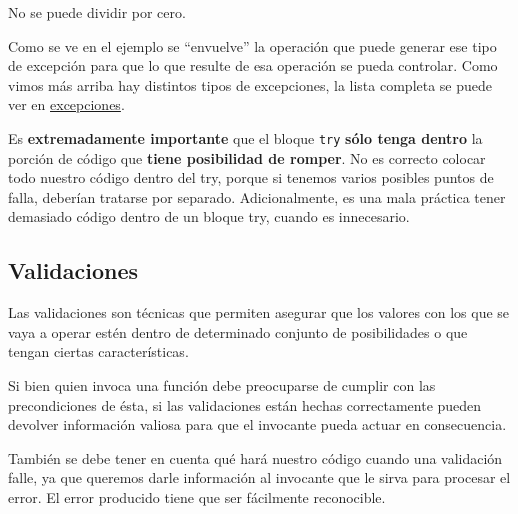 \documentclass[
  letterpaper,
  DIV=11,
  numbers=noendperiod]{scrreprt}
\newenvironment{Shaded}{\begin{snugshade}}{\end{snugshade}}
\newcommand{\ExtensionTok}[1]{\textcolor[rgb]{0.00,0.23,0.31}{#1}}
\newcommand{\NormalTok}[1]{\textcolor[rgb]{0.00,0.23,0.31}{#1}}
\begin{document}
\begin{Shaded}
\begin{Highlighting}[]
\ExtensionTok{No}\NormalTok{ se puede dividir por cero.}
\end{Highlighting}
\end{Shaded}

Como se ve en el ejemplo se ``envuelve'' la operación que puede generar
ese tipo de excepción para que lo que resulte de esa operación se pueda
controlar. Como vimos más arriba hay distintos tipos de excepciones, la
lista completa se puede ver en
\href{https://docs.python.org/es/3/library/exceptions.html\#base-classes}{excepciones}.

\begin{tcolorbox}[enhanced jigsaw, opacitybacktitle=0.6, toptitle=1mm, toprule=.15mm, arc=.35mm, breakable, bottomrule=.15mm, opacityback=0, leftrule=.75mm, rightrule=.15mm, title=\textcolor{quarto-callout-tip-color}{\faLightbulb}\hspace{0.5em}{Tip}, left=2mm, bottomtitle=1mm, colframe=quarto-callout-tip-color-frame, colback=white, titlerule=0mm, coltitle=black, colbacktitle=quarto-callout-tip-color!10!white]

Es \textbf{extremadamente importante} que el bloque \texttt{try}
\textbf{sólo tenga dentro} la porción de código que \textbf{tiene
posibilidad de romper}. No es correcto colocar todo nuestro código
dentro del try, porque si tenemos varios posibles puntos de falla,
deberían tratarse por separado. Adicionalmente, es una mala práctica
tener demasiado código dentro de un bloque try, cuando es innecesario.

\end{tcolorbox}

\subsection{Validaciones}\label{validaciones}

Las validaciones son técnicas que permiten asegurar que los valores con
los que se vaya a operar estén dentro de determinado conjunto de
posibilidades o que tengan ciertas características.

Si bien quien invoca una función debe preocuparse de cumplir con las
precondiciones de ésta, si las validaciones están hechas correctamente
pueden devolver información valiosa para que el invocante pueda actuar
en consecuencia.

También se debe tener en cuenta qué hará nuestro código cuando una
validación falle, ya que queremos darle información al invocante que le
sirva para procesar el error. El error producido tiene que ser
fácilmente reconocible.
\end{document}
